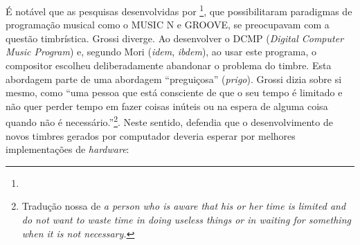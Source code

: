 É notável que as pesquisas desenvolvidas por \cite{mathews_digital_1963}\footnote{}, que possibilitaram paradigmas de programação musical como o MUSIC N e GROOVE, se preocupavam com a questão timbrística. Grossi diverge. Ao desenvolver o DCMP (\emph{Digital Computer Music Program}) e, segundo Mori (\emph{idem}, \emph{ibdem}), ao usar este programa, o compositor escolheu deliberadamente abandonar o problema do timbre. Esta abordagem parte de uma abordagem ``preguiçosa'' (\emph{prigo}). Grossi dizia sobre si mesmo, como ``uma pessoa que está consciente de que o seu tempo é limitado e não quer perder tempo em fazer coisas inúteis ou na espera de alguma coisa quando não é necessário.''\footnote{Tradução nossa de \emph{a person who is aware that his or her time is limited and do not want to waste time in doing useless things or in waiting for something when it is not necessary.}}. Neste sentido, defendia que o desenvolvimento de novos timbres gerados por computador deveria esperar por melhores implementações de \emph{hardware}:

